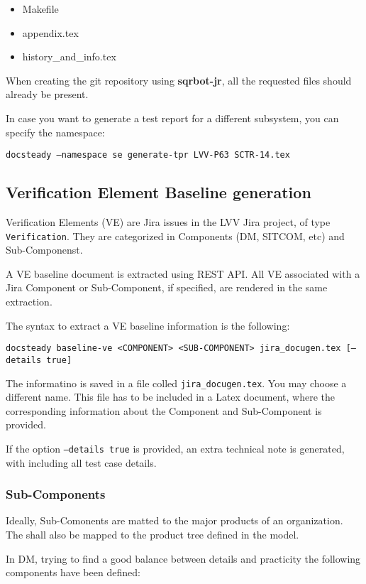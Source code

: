 \documentclass[DM]{lsstdoc}
\begin{document}
\begin{itemize}
\item Makefile
\item appendix.tex
\item history\_and\_info.tex
\end{itemize}

When creating the git repository using \textbf{sqrbot-jr}, all the requested files should already be present.

In case you want to generate a test report for a different subsystem, you can specify the  namespace:

\texttt{docsteady --namespace se generate-tpr LVV-P63 SCTR-14.tex}



\subsection{Verification Element Baseline generation}

Verification Elements (VE) are Jira issues in the LVV Jira project, of type \texttt{Verification}.
They are categorized in Components (DM, SITCOM, etc) and Sub-Componenst.

A VE baseline document is extracted using REST API.
All VE associated with a Jira Component or Sub-Component, if specified, are rendered in the same extraction.

The syntax to extract a VE baseline information is the following:

\texttt{docsteady baseline-ve <COMPONENT> <SUB-COMPONENT> jira\_docugen.tex [--details true]}

The informatino is saved in a file colled \texttt{jira\_docugen.tex}. You may choose a different name.
This file has to be included in a Latex document, where the corresponding information about the Component and Sub-Component is provided.

If the option \texttt{--details true} is provided, an extra technical note is generated, with including all test case details.


\subsubsection{Sub-Components}

Ideally, Sub-Comonents are matted to the major products of an organization. 
The shall also be mapped to the product tree defined in the model.

In DM, trying to find a good balance between details and practicity the following components have been defined:
\end{document}

